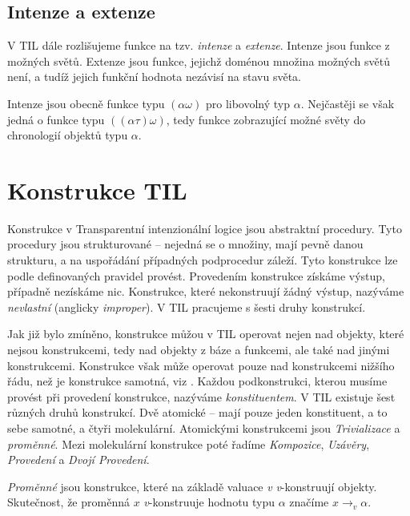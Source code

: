 \subsection{Intenze a extenze}

V TIL dále rozlišujeme funkce na tzv. \textit{intenze} a \textit{extenze}. Intenze jsou funkce
z možných světů. Extenze jsou funkce, jejichž doménou množina možných světů není, a tudíž jejich
funkční hodnota nezávisí na stavu světa.

Intenze jsou obecně funkce typu $(\alpha\omega)$ pro libovolný typ $\alpha$. Nejčastěji se však
jedná o funkce typu $((\alpha\tau)\omega)$, tedy funkce zobrazující možné světy do chronologií
objektů typu $\alpha$.

\section{Konstrukce TIL}

Konstrukce v Transparentní intenzionální logice jsou abstraktní procedury. Tyto procedury jsou
strukturované -- nejedná se o množiny, mají pevně danou strukturu, a na uspořádání případných
podprocedur záleží. Tyto konstrukce lze podle definovaných pravidel provést. Provedením konstrukce
získáme výstup, případně nezískáme nic. Konstrukce, které nekonstruují žádný výstup, nazýváme
\textit{nevlastní} (anglicky \textit{improper}). V TIL pracujeme s šesti druhy konstrukcí.

Jak již bylo zmíněno, konstrukce můžou v TIL operovat nejen nad objekty, které nejsou konstrukcemi,
tedy nad objekty z báze a funkcemi, ale také nad jinými konstrukcemi. Konstrukce však může operovat
pouze nad konstrukcemi nižšího řádu, než je konstrukce samotná, viz . Každou
podkonstrukci, kterou musíme provést při provedení konstrukce, nazýváme \textit{konstituentem}.
V TIL existuje šest různých druhů konstrukcí. Dvě atomické -- mají pouze jeden konstituent, a to
sebe samotné, a čtyři molekulární. Atomickými konstrukcemi jsou \textit{Trivializace} a
\textit{proměnné}. Mezi molekulární konstrukce poté řadíme \textit{Kompozice}, \textit{Uzávěry},
\textit{Provedení} a \textit{Dvojí Provedení}.

\textit{Proměnné} jsou konstrukce, které na základě valuace \textit{v} \textit{v}-konstruují
objekty. Skutečnost, že proměnná $x$ \textit{v}-konstruuje hodnotu typu $\alpha$ značíme
$x \rightarrow_v \alpha$.

